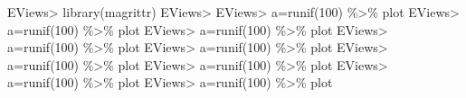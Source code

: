 \documentclass[
]{article}
\newenvironment{Shaded}{\begin{snugshade}}{\end{snugshade}}
\newcommand{\DecValTok}[1]{\textcolor[rgb]{0.00,0.00,0.81}{#1}}
\newcommand{\FunctionTok}[1]{\textcolor[rgb]{0.00,0.00,0.00}{#1}}
\newcommand{\NormalTok}[1]{#1}
\newcommand{\OtherTok}[1]{\textcolor[rgb]{0.56,0.35,0.01}{#1}}
\newcommand{\SpecialCharTok}[1]{\textcolor[rgb]{0.00,0.00,0.00}{#1}}
\begin{document}
\begin{Shaded}
\begin{Highlighting}[]
\NormalTok{EViews}\SpecialCharTok{\textgreater{}} \FunctionTok{library}\NormalTok{(magrittr)}
\NormalTok{EViews}\SpecialCharTok{\textgreater{}}
\NormalTok{EViews}\SpecialCharTok{\textgreater{}}\NormalTok{ a}\OtherTok{=}\FunctionTok{runif}\NormalTok{(}\DecValTok{100}\NormalTok{) }\SpecialCharTok{\%\textgreater{}\%}\NormalTok{ plot}
\NormalTok{EViews}\SpecialCharTok{\textgreater{}}\NormalTok{ a}\OtherTok{=}\FunctionTok{runif}\NormalTok{(}\DecValTok{100}\NormalTok{) }\SpecialCharTok{\%\textgreater{}\%}\NormalTok{ plot}
\NormalTok{EViews}\SpecialCharTok{\textgreater{}}\NormalTok{ a}\OtherTok{=}\FunctionTok{runif}\NormalTok{(}\DecValTok{100}\NormalTok{) }\SpecialCharTok{\%\textgreater{}\%}\NormalTok{ plot}
\NormalTok{EViews}\SpecialCharTok{\textgreater{}}\NormalTok{ a}\OtherTok{=}\FunctionTok{runif}\NormalTok{(}\DecValTok{100}\NormalTok{) }\SpecialCharTok{\%\textgreater{}\%}\NormalTok{ plot}
\NormalTok{EViews}\SpecialCharTok{\textgreater{}}\NormalTok{ a}\OtherTok{=}\FunctionTok{runif}\NormalTok{(}\DecValTok{100}\NormalTok{) }\SpecialCharTok{\%\textgreater{}\%}\NormalTok{ plot}
\NormalTok{EViews}\SpecialCharTok{\textgreater{}}\NormalTok{ a}\OtherTok{=}\FunctionTok{runif}\NormalTok{(}\DecValTok{100}\NormalTok{) }\SpecialCharTok{\%\textgreater{}\%}\NormalTok{ plot}
\NormalTok{EViews}\SpecialCharTok{\textgreater{}}\NormalTok{ a}\OtherTok{=}\FunctionTok{runif}\NormalTok{(}\DecValTok{100}\NormalTok{) }\SpecialCharTok{\%\textgreater{}\%}\NormalTok{ plot}
\NormalTok{EViews}\SpecialCharTok{\textgreater{}}\NormalTok{ a}\OtherTok{=}\FunctionTok{runif}\NormalTok{(}\DecValTok{100}\NormalTok{) }\SpecialCharTok{\%\textgreater{}\%}\NormalTok{ plot}
\NormalTok{EViews}\SpecialCharTok{\textgreater{}}\NormalTok{ a}\OtherTok{=}\FunctionTok{runif}\NormalTok{(}\DecValTok{100}\NormalTok{) }\SpecialCharTok{\%\textgreater{}\%}\NormalTok{ plot}
\end{Highlighting}
\end{Shaded}
\end{document}
